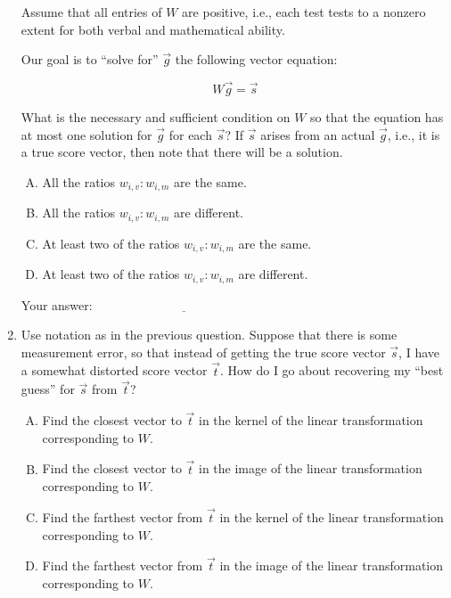 \documentclass[10pt]{amsart}
\begin{document}
\begin{enumerate}
  Assume that all entries of $W$ are positive, i.e., each test tests
  to a nonzero extent for both verbal and mathematical ability.

  Our goal is to ``solve for'' $\vec{g}$ the following vector
  equation:

  $$W\vec{g} = \vec{s}$$

  What is the necessary and sufficient condition on $W$ so that the
  equation has at most one solution for $\vec{g}$ for each $\vec{s}$?
  If $\vec{s}$ arises from an actual $\vec{g}$, i.e., it is a true
  score vector, then note that there will be a solution.

  \begin{enumerate}[(A)]
  \item All the ratios $w_{i,v}:w_{i,m}$ are the same.
  \item All the ratios $w_{i,v}:w_{i,m}$ are different.
  \item At least two of the ratios $w_{i,v}:w_{i,m}$ are the same.
  \item At least two of the ratios $w_{i,v}:w_{i,m}$ are different.
  \end{enumerate}

  \vspace{0.1in}
  Your answer: $\underline{\qquad\qquad\qquad\qquad\qquad\qquad\qquad}$
  \vspace{0.1in}

\item Use notation as in the previous question. Suppose that there is
  some measurement error, so that instead of getting the true score
  vector $\vec{s}$, I have a somewhat distorted score vector
  $\vec{t}$. How do I go about recovering my ``best guess'' for
  $\vec{s}$ from $\vec{t}$?

  \begin{enumerate}[(A)]
  \item Find the closest vector to $\vec{t}$ in the kernel of the
    linear transformation corresponding to $W$.
  \item Find the closest vector to $\vec{t}$ in the image of the
    linear transformation corresponding to $W$.
  \item Find the farthest vector from $\vec{t}$ in the kernel of the
    linear transformation corresponding to $W$.
  \item Find the farthest vector from $\vec{t}$ in the image of the
    linear transformation corresponding to $W$.
  \end{enumerate}


\end{enumerate}
\end{document}
